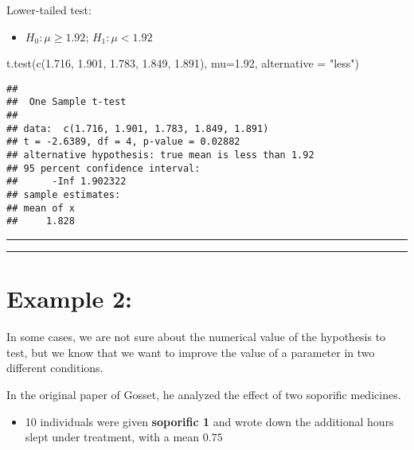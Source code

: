 \documentclass[
]{book}
\newenvironment{Shaded}{\begin{snugshade}}{\end{snugshade}}
\newcommand{\AttributeTok}[1]{\textcolor[rgb]{0.77,0.63,0.00}{#1}}
\newcommand{\FloatTok}[1]{\textcolor[rgb]{0.00,0.00,0.81}{#1}}
\newcommand{\FunctionTok}[1]{\textcolor[rgb]{0.00,0.00,0.00}{#1}}
\newcommand{\NormalTok}[1]{#1}
\newcommand{\StringTok}[1]{\textcolor[rgb]{0.31,0.60,0.02}{#1}}
\providecommand{\tightlist}{%
  \setlength{\itemsep}{0pt}\setlength{\parskip}{0pt}}
\begin{document}
Lower-tailed test:

\begin{itemize}
\tightlist
\item
  \(H_0:\mu \geq 1.92\); \(H_1:\mu < 1.92\)
\end{itemize}

\begin{Shaded}
\begin{Highlighting}[]
\FunctionTok{t.test}\NormalTok{(}\FunctionTok{c}\NormalTok{(}\FloatTok{1.716}\NormalTok{, }\FloatTok{1.901}\NormalTok{, }\FloatTok{1.783}\NormalTok{, }\FloatTok{1.849}\NormalTok{, }\FloatTok{1.891}\NormalTok{), }
       \AttributeTok{mu=}\FloatTok{1.92}\NormalTok{, }\AttributeTok{alternative =} \StringTok{"less"}\NormalTok{)}
\end{Highlighting}
\end{Shaded}

\begin{verbatim}
## 
##  One Sample t-test
## 
## data:  c(1.716, 1.901, 1.783, 1.849, 1.891)
## t = -2.6389, df = 4, p-value = 0.02882
## alternative hypothesis: true mean is less than 1.92
## 95 percent confidence interval:
##      -Inf 1.902322
## sample estimates:
## mean of x 
##     1.828
\end{verbatim}

\begin{center}\rule{0.5\linewidth}{0.5pt}\end{center}

\begin{center}\rule{0.5\linewidth}{0.5pt}\end{center}

\hypertarget{example-2-3}{%
\section{Example 2:}\label{example-2-3}}

In some cases, we are not sure about the numerical value of the hypothesis to test, but we know that we want to improve the value of a parameter in two different conditions.

In the original paper of Gosset, he analyzed the effect of two soporific medicines.

\begin{itemize}
\tightlist
\item
  10 individuals were given \textbf{soporific 1} and wrote down the additional hours slept under treatment, with a mean \(0.75\)
\end{itemize}
\end{document}
